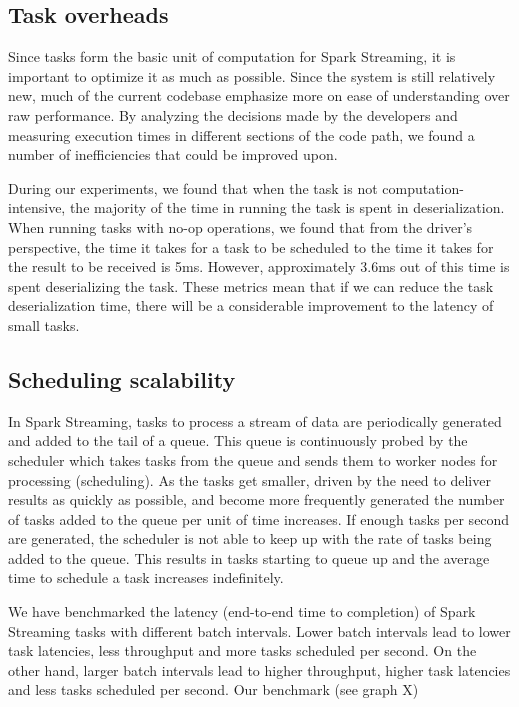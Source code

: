 \subsection{Task overheads}
Since tasks form the basic unit of computation for Spark Streaming, it is important to optimize it as much as possible. Since the system is still relatively new, much of the current codebase emphasize more on ease of understanding over raw performance. By analyzing the decisions made by the developers and measuring execution times in different sections of the code path, we found a number of inefficiencies that could be improved upon.

During our experiments, we found that when the task is not computation-intensive, the majority of the time in running the task is spent in deserialization. When running tasks with no-op operations, we found that from the driver's perspective, the time it takes for a task to be scheduled to the time it takes for the result to be received is 5ms. However, approximately 3.6ms out of this time is spent deserializing the task. These metrics mean that if we can reduce the task deserialization time, there will be a considerable improvement to the latency of small tasks.


\subsection{Scheduling scalability}

In Spark Streaming, tasks to process a stream of data are periodically generated and added to the tail of a queue. This queue is continuously probed by the scheduler which takes tasks from the queue and sends them to worker nodes for processing (scheduling).
As the tasks get smaller, driven by the need to deliver results as quickly as possible, and become more frequently generated the number of tasks added to the queue per unit of time increases. If enough tasks per second are generated, the scheduler is not able to keep up with the rate of tasks being added to the queue. This results in tasks starting to queue up and the average time to schedule a task increases indefinitely.

We have benchmarked the latency (end-to-end time to completion) of Spark Streaming tasks with different batch intervals. Lower batch intervals lead to lower task latencies, less throughput and more tasks scheduled per second. On the other hand, larger batch intervals lead to higher throughput, higher task latencies and less tasks scheduled per second. Our benchmark (see graph X)  

